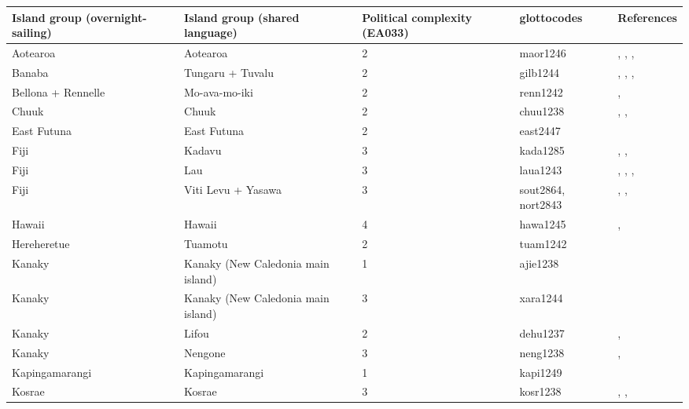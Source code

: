 \begin{longtable}{p{4.5cm}p{2cm}p{2cm}p{4cm}p{4cm}}
  \toprule
Island group (overnight-sailing) & Island group (shared language) & Political complexity (EA033) & glottocodes & References \\ 
  \midrule
Aotearoa & Aotearoa & 2 & maor1246 & \citet{sahlins1958social}, \citet{buck1952}, \citet{kirch1984evolution}, \citet{van1995maori} \\ 
  Banaba & Tungaru + Tuvalu & 2 & gilb1244 & \citet{lambert1966}, \citet{lambert1975makin}, \citet{lambert1991}, \citet{macdonald1982cinderellas} \\ 
  Bellona + Rennelle & Mo-ava-mo-iki & 2 & renn1242 & \citet{birketsmith1956}, \citet{monberg1991bellona} \\ 
  Chuuk & Chuuk & 2 & chuu1238 & \citet{goodenough1991}, \citet{goodenough2002under}, \citet{mahony1960taro} \\ 
  East Futuna & East Futuna & 2 & east2447 & \citet{kirch1994wet} \\ 
  Fiji & Kadavu & 3 & kada1285 & \citet{kuhlken2002intensive}, \citet{scarr1984fiji}, \citet{walter1978examination} \\ 
  Fiji & Lau & 3 & laua1243 & \citet{hocart_1929}, \citet{quain_1948}, \citet{thompson1940a}, \citet{thompson1940b} \\ 
  Fiji & Viti Levu + Yasawa & 3 & sout2864, nort2843 & \citet{kuhlken2002intensive}, \citet{scarr1984fiji}, \citet{walter1978examination} \\ 
  Hawaii & Hawaii & 4 & hawa1245 & \citet{kirch1994wet}, \citet{kirch2010chiefs} \\ 
  Hereheretue & Tuamotu & 2 & tuam1242 & \citet{emory1975material} \\ 
  Kanaky & Kanaky (New Caledonia main island) & 1 & ajie1238 & \citet{winslow1991} \\ 
  Kanaky & Kanaky (New Caledonia main island) & 3 & xara1244 & \citet{young1991goodenough} \\ 
  Kanaky & Lifou & 2 & dehu1237 & \citet{hadfield_1920}, \citet{ray1917people} \\ 
  Kanaky & Nengone & 3 & neng1238 & \citet{dubois1984gens}, \citet{guiart1952organisation} \\ 
  Kapingamarangi & Kapingamarangi & 1 & kapi1249 & \citet{buck1950} \\ 
  Kosrae & Kosrae & 3 & kosr1238 & \citet{athens2007prehistoric}, \citet{graves1986late}, \citet{peoples1991} \\ 

\end{longtable}
